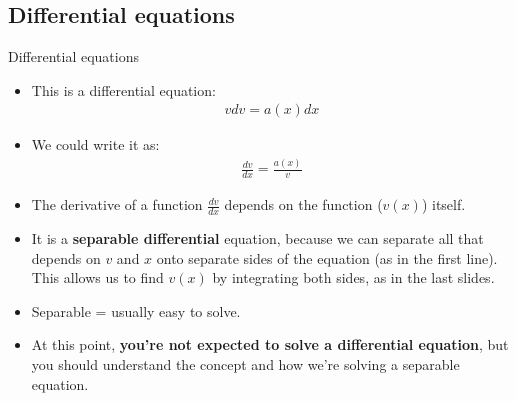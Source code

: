 \documentclass[aspectratio=169,
hyperref={colorlinks,urlcolor=blue}
]{beamer}
\begin{document}
\subsection{Differential equations}
\label{subsec:differentialequations}
\begin{frame}{Differential equations}
\begin{itemize}
\item This is a differential equation:
\begin{align*}
vdv=a(x)dx
\end{align*}
\item We could write it as:
\begin{align*}
\frac{dv}{dx}=\frac{a(x)}{v}
\end{align*}
\item The derivative of a function $\frac{dv}{dx}$ depends on the function ($v(x)$) itself.
\item It is a \textbf{separable differential} equation, because we can separate all that depends on $v$ and $x$ onto separate sides of the equation (as in the first line). This allows us to find $v(x)$ by integrating both sides, as in the last slides.
\item Separable = usually easy to solve.
\item At this point, \textbf{you're not expected to solve a differential equation}, but you should understand the concept and how we're solving a separable equation. 
\end{itemize}

\end{frame}


\end{document}
